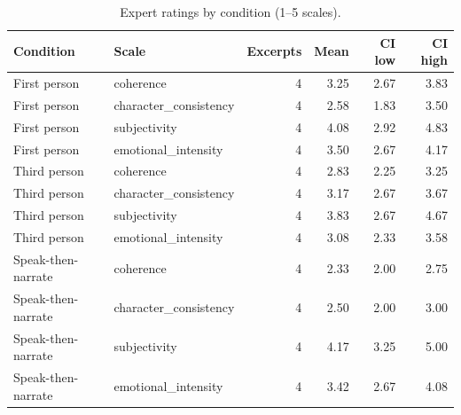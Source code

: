 \documentclass[10pt]{article}
\begin{document}
{\scriptsize
\begin{longtable}{llrrrr}
\caption{Expert ratings by condition (1--5 scales).}\\
\toprule
Condition & Scale & Excerpts & Mean & CI low & CI high \\
\midrule
\endhead
First person & coherence & 4 & 3.25 & 2.67 & 3.83 \\
First person & character\_consistency & 4 & 2.58 & 1.83 & 3.50 \\
First person & subjectivity & 4 & 4.08 & 2.92 & 4.83 \\
First person & emotional\_intensity & 4 & 3.50 & 2.67 & 4.17 \\
Third person & coherence & 4 & 2.83 & 2.25 & 3.25 \\
Third person & character\_consistency & 4 & 3.17 & 2.67 & 3.67 \\
Third person & subjectivity & 4 & 3.83 & 2.67 & 4.67 \\
Third person & emotional\_intensity & 4 & 3.08 & 2.33 & 3.58 \\
Speak-then-narrate & coherence & 4 & 2.33 & 2.00 & 2.75 \\
Speak-then-narrate & character\_consistency & 4 & 2.50 & 2.00 & 3.00 \\
Speak-then-narrate & subjectivity & 4 & 4.17 & 3.25 & 5.00 \\
Speak-then-narrate & emotional\_intensity & 4 & 3.42 & 2.67 & 4.08 \\
\bottomrule
\end{longtable}
}
\end{document}
